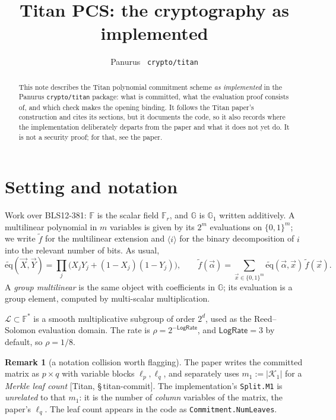 \documentclass[11pt,a4paper]{article}
\title{Titan PCS: the cryptography as implemented}
\author{Panurus \textemdash\ \texttt{crypto/titan}}
\date{}
\newcommand{\F}{\mathbb{F}}
\newcommand{\G}{\mathbb{G}}
\newcommand{\dom}{\mathcal{L}}
\newcommand{\bin}[1]{\langle #1 \rangle}
\newcommand{\eq}{\widetilde{\mathrm{eq}}}
\newcommand{\paper}[1]{\textsf{[Titan, #1]}}
\theoremstyle{definition}
\newtheorem{remark}{Remark}
\begin{document}
\maketitle

\begin{abstract}
\noindent
This note describes the Titan polynomial commitment scheme \emph{as implemented} in
the Panurus \texttt{crypto/titan} package: what is committed, what the evaluation
proof consists of, and which check makes the opening binding. It follows the Titan
paper's construction and cites its sections, but it documents the code, so it also
records where the implementation deliberately departs from the paper and what it does
not yet do. It is not a security proof; for that, see the paper.
\end{abstract}

\section{Setting and notation}

Work over BLS12-381: $\F$ is the scalar field $\F_r$, and $\G$ is $\mathbb{G}_1$
written additively. A multilinear polynomial in $m$ variables is given by its
$2^m$ evaluations on $\{0,1\}^m$; we write $\widetilde{f}$ for the multilinear
extension and $\bin{i}$ for the binary decomposition of $i$ into the relevant number
of bits. As usual,
\[
  \eq(\vec X, \vec Y) = \prod_{j} \bigl( X_j Y_j + (1-X_j)(1-Y_j) \bigr),
  \qquad
  \widetilde{f}(\vec\alpha) = \sum_{\vec x \in \{0,1\}^m} \eq(\vec\alpha, \vec x)\, \widetilde{f}(\vec x).
\]
A \emph{group multilinear} is the same object with coefficients in $\G$; its
evaluation is a group element, computed by multi-scalar multiplication.

$\dom \subset \F^\ast$ is a smooth multiplicative subgroup of order $2^d$, used as the
Reed--Solomon evaluation domain. The rate is $\rho = 2^{-\mathsf{LogRate}}$, and
$\mathsf{LogRate} = 3$ by default, so $\rho = 1/8$.

\begin{remark}[a notation collision worth flagging]
The paper writes the committed matrix as $p \times q$ with variable blocks
$\ell_p, \ell_q$, and separately uses $m_1 := |\mathcal{K}_1|$ for a \emph{Merkle leaf
count} \paper{\S\,titan-commit}. The implementation's \texttt{Split.M1} is
\emph{unrelated} to that $m_1$: it is the number of \emph{column} variables of the
matrix, the paper's $\ell_q$. The leaf count appears in the code as
\texttt{Commitment.NumLeaves}.
\end{remark}
\end{document}
